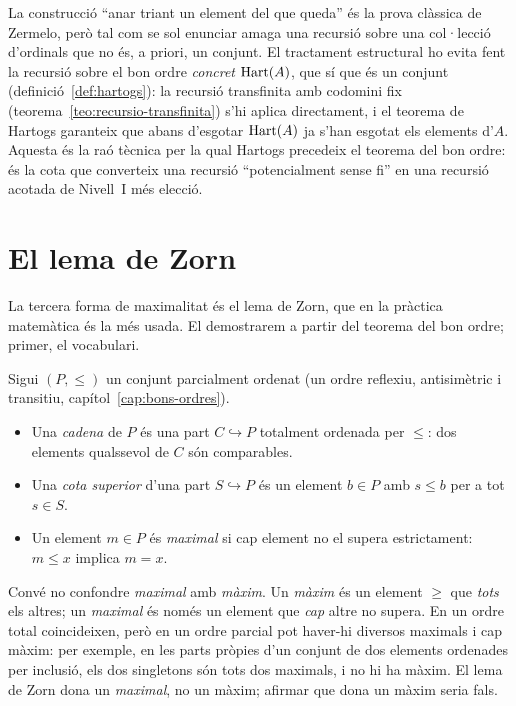 \begin{observacio}\label{obs:cota-hartogs}
La construcció \enquote{anar triant un element del que queda} és la prova
clàssica de Zermelo, però tal com se sol enunciar amaga una recursió sobre
una col·lecció d'ordinals que no és, a priori, un conjunt. El tractament
estructural ho evita fent la recursió sobre el bon ordre \emph{concret}
\(\operatorname{Hart}(A)\), que sí que és un conjunt (definició~\ref{def:hartogs}): la
recursió transfinita amb codomini fix (teorema~\ref{teo:recursio-transfinita})
s'hi aplica directament, i el teorema de Hartogs garanteix que abans
d'esgotar \(\operatorname{Hart}(A)\) ja s'han esgotat els elements d'\(A\). Aquesta és la
raó tècnica per la qual Hartogs precedeix el teorema del bon ordre: és la cota
que converteix una recursió \enquote{potencialment sense fi} en una recursió
acotada de Nivell~I més elecció.
\end{observacio}

\section{El lema de Zorn}\label{sec:zorn}

La tercera forma de maximalitat és el lema de Zorn, que en la pràctica
matemàtica és la més usada. El demostrarem a partir del teorema del bon
ordre; primer, el vocabulari.

\begin{definicio}\label{def:zorn-nocions}
Sigui \((P,\le)\) un conjunt parcialment ordenat (un ordre reflexiu,
antisimètric i transitiu, capítol~\ref{cap:bons-ordres}).
\begin{itemize}
\item Una \emph{cadena} de \(P\) és una part \(C\hookrightarrow P\) totalment
ordenada per \(\le\): dos elements qualssevol de \(C\) són comparables.
\item Una \emph{cota superior} d'una part \(S\hookrightarrow P\) és un
element \(b\in P\) amb \(s\le b\) per a tot \(s\in S\).
\item Un element \(m\in P\) és \emph{maximal} si cap element no el supera
estrictament: \(m\le x\) implica \(m=x\).
\end{itemize}
\end{definicio}

\begin{observacio}\label{obs:maximal-maxim}
Convé no confondre \emph{maximal} amb \emph{màxim}. Un \emph{màxim} és un
element \(\ge\) que \emph{tots} els altres; un \emph{maximal} és només un
element que \emph{cap} altre no supera. En un ordre total coincideixen, però
en un ordre parcial pot haver-hi diversos maximals i cap màxim: per exemple,
en les parts pròpies d'un conjunt de dos elements ordenades per inclusió, els
dos singletons són tots dos maximals, i no hi ha màxim. El lema de Zorn dona
un \emph{maximal}, no un màxim; afirmar que dona un màxim seria fals.
\end{observacio}

